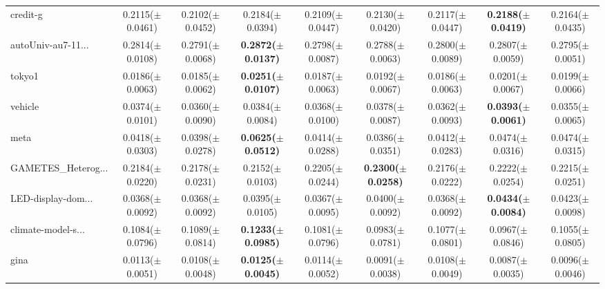 \begin{longtable}{lcccccccc}
credit-g & 0.2115($\pm$0.0461) & 0.2102($\pm$0.0452) & 0.2184($\pm$0.0394) & 0.2109($\pm$0.0447) & 0.2130($\pm$0.0420) & 0.2117($\pm$0.0447) & \textbf{0.2188($\pm$0.0419)} & 0.2164($\pm$0.0435) \\
autoUniv-au7-11... & 0.2814($\pm$0.0108) & 0.2791($\pm$0.0068) & \textbf{0.2872($\pm$0.0137)} & 0.2798($\pm$0.0087) & 0.2788($\pm$0.0063) & 0.2800($\pm$0.0089) & 0.2807($\pm$0.0059) & 0.2795($\pm$0.0051) \\
tokyo1 & 0.0186($\pm$0.0063) & 0.0185($\pm$0.0062) & \textbf{0.0251($\pm$0.0107)} & 0.0187($\pm$0.0063) & 0.0192($\pm$0.0067) & 0.0186($\pm$0.0063) & 0.0201($\pm$0.0067) & 0.0199($\pm$0.0066) \\
vehicle & 0.0374($\pm$0.0101) & 0.0360($\pm$0.0090) & 0.0384($\pm$0.0084) & 0.0368($\pm$0.0100) & 0.0378($\pm$0.0087) & 0.0362($\pm$0.0093) & \textbf{0.0393($\pm$0.0061)} & 0.0355($\pm$0.0065) \\
meta & 0.0418($\pm$0.0303) & 0.0398($\pm$0.0278) & \textbf{0.0625($\pm$0.0512)} & 0.0414($\pm$0.0288) & 0.0386($\pm$0.0351) & 0.0412($\pm$0.0283) & 0.0474($\pm$0.0316) & 0.0474($\pm$0.0315) \\
GAMETES\_Heterog... & 0.2184($\pm$0.0220) & 0.2178($\pm$0.0231) & 0.2152($\pm$0.0103) & 0.2205($\pm$0.0244) & \textbf{0.2300($\pm$0.0258)} & 0.2176($\pm$0.0222) & 0.2222($\pm$0.0254) & 0.2215($\pm$0.0251) \\
LED-display-dom... & 0.0368($\pm$0.0092) & 0.0368($\pm$0.0092) & 0.0395($\pm$0.0105) & 0.0367($\pm$0.0095) & 0.0400($\pm$0.0092) & 0.0368($\pm$0.0092) & \textbf{0.0434($\pm$0.0084)} & 0.0423($\pm$0.0098) \\
climate-model-s... & 0.1084($\pm$0.0796) & 0.1089($\pm$0.0814) & \textbf{0.1233($\pm$0.0985)} & 0.1081($\pm$0.0796) & 0.0983($\pm$0.0781) & 0.1077($\pm$0.0801) & 0.0967($\pm$0.0846) & 0.1055($\pm$0.0805) \\
gina & 0.0113($\pm$0.0051) & 0.0108($\pm$0.0048) & \textbf{0.0125($\pm$0.0045)} & 0.0114($\pm$0.0052) & 0.0091($\pm$0.0038) & 0.0108($\pm$0.0049) & 0.0087($\pm$0.0035) & 0.0096($\pm$0.0046) \\
\bottomrule
\end{longtable}
